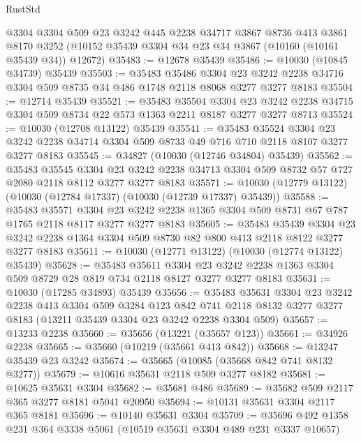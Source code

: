 \begin{lexlean}{RustStd}
\begin{coremodule}
    @3304
    @3304
    @509
    @23
    @3242
    @445
    @2238
    @34717
    @3867
    @8736
    @413
    @3861
    @8170
    @3252
    (@10152 @35439 @3304 @34 @23 @34 @3867 (@10160 (@10161 @35439 @34)) @12672)
@35483 := @12678 @35439
@35486 := @10030 (@10845 @34739) @35439
@35503 := @35483
    @35486
    @3304
    @23
    @3242
    @2238
    @34716
    @3304
    @509
    @8735
    @34
    @486
    @1748
    @2118
    @8068
    @3277
    @3277
    @8183
@35504 := @12714 @35439
@35521 := @35483
    @35504
    @3304
    @23
    @3242
    @2238
    @34715
    @3304
    @509
    @8734
    @22
    @573
    @1363
    @2211
    @8187
    @3277
    @3277
    @8713
@35524 := @10030 (@12708 @13122) @35439
@35541 := @35483
    @35524
    @3304
    @23
    @3242
    @2238
    @34714
    @3304
    @509
    @8733
    @49
    @716
    @710
    @2118
    @8107
    @3277
    @3277
    @8183
@35545 := @34827 (@10030 (@12746 @34804) @35439)
@35562 := @35483
    @35545
    @3304
    @23
    @3242
    @2238
    @34713
    @3304
    @509
    @8732
    @57
    @727
    @2080
    @2118
    @8112
    @3277
    @3277
    @8183
@35571 := @10030 (@12779 @13122) (@10030 (@12784 @17337) (@10030 (@12739 @17337) @35439))
@35588 := @35483
    @35571
    @3304
    @23
    @3242
    @2238
    @1365
    @3304
    @509
    @8731
    @67
    @787
    @1765
    @2118
    @8117
    @3277
    @3277
    @8183
@35605 := @35483
    @35439
    @3304
    @23
    @3242
    @2238
    @1364
    @3304
    @509
    @8730
    @82
    @800
    @413
    @2118
    @8122
    @3277
    @3277
    @8183
@35611 := @10030 (@12771 @13122) (@10030 (@12774 @13122) @35439)
@35628 := @35483
    @35611
    @3304
    @23
    @3242
    @2238
    @1363
    @3304
    @509
    @8729
    @28
    @819
    @734
    @2118
    @8127
    @3277
    @3277
    @8183
@35631 := @10030 (@17285 @34893) @35439
@35656 := @35483
    @35631
    @3304
    @23
    @3242
    @2238
    @413
    @3304
    @509
    @3284
    @123
    @842
    @741
    @2118
    @8132
    @3277
    @3277
    @8183
    (@13211 @35439 @3304 @23 @3242 @2238 @3304 @509)
@35657 := @13233 @2238
@35660 := @35656 (@13221 (@35657 @123))
@35661 := @34926 @2238
@35665 := @35660 (@10219 (@35661 @413 @842))
@35668 := @13247 @35439 @23 @3242
@35674 := @35665 (@10085 (@35668 @842 @741 @8132 @3277))
@35679 := @10616 @35631 @2118 @509 @3277 @8182
@35681 := @10625 @35631 @3304
@35682 := @35681 @486
@35689 := @35682 @509 @2117 @365 @3277 @8181 @5041 @20950
@35694 := @10131 @35631 @3304 @2117 @365 @8181
@35696 := @10140 @35631 @3304
@35709 := @35696 @492 @1358 @231 @364 @3338 @5061 (@10519 @35631 @3304 @489 @231 @3337 @10657)

\end{coremodule}
\end{lexlean}
